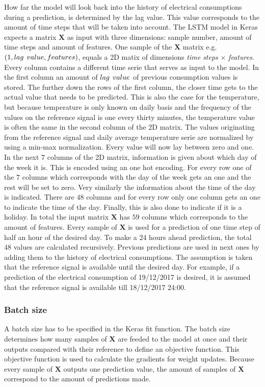 How far the model will look back into the history of electrical consumptions during a prediction, is determined by the lag value. This value corresponds to the amount of time steps that will be taken into account. The LSTM model in Keras expects a matrix $ \bm{X} $ as input with three dimensions: sample number, amount of time steps and amount of features. 
One sample of the $ \bm{X} $ matrix e.g. $ (1,lag\hspace{1.5mm}value, features) $, equals a 2D matix of dimensions  \textit{time steps} $ \times $ \textit{features}. Every column contains a different time serie that serves as input to the model. In the first column an amount of $ lag\hspace{1.5mm}value $ of previous consumption values is stored. The further down the rows of the first column, the closer time gets to the actual value that needs to be predicted. This is also the case for the temperature, but because temperature is only known on daily basis and the frequency of the values on the reference signal is one every thirty minutes, the temperature value is often the same in the second column of the 2D matrix. The values originating from the reference signal and daily average temperature serie are normalized by using a min-max normalization. Every value will now lay between zero and one.\\
In the next $ 7 $ columns of the 2D matrix, information is given about which day of the week it is. This is encoded using an one hot encoding. For every row one of the $ 7 $ columns which corresponds with the day of the week gets an one and the rest will be set to zero. Very similarly the information about the time of the day is indicated. There are $ 48 $ columns and for every row only one column gets an one to indicate the time of the day. Finally, this is also done to indicate if it is a holiday. In total the input matrix $ \bm{X} $ has $ 59  $ columns which corresponds to the amount of features. Every sample of $ \bm{X} $ is used for a prediction of one time step of half an hour of the desired day. To make a 24 hours ahead prediction, the total $ 48 $ values are calculated recursively. Previous predictions are used in next ones by adding them to the history of electrical consumptions. The assumption is taken that the reference signal is available until the desired day. For example, if a prediction of the electrical consumption of 19/12/2017 is desired, it is assumed that the reference signal is available till 18/12/2017 24:00.

\subsubsection{Batch size}
A batch size has to be specified in the Keras fit function. The batch size determines how many samples of $ \bm{X} $ are feeded to the model at once and their outputs compared with their reference to define an objective function. This objective function is used to calculate the gradients for weight updates. Because every sample of $ \bm{X} $ outputs one prediction value, the amount of samples of $ \bm{X} $ correspond to the amount of predictions made.\\

